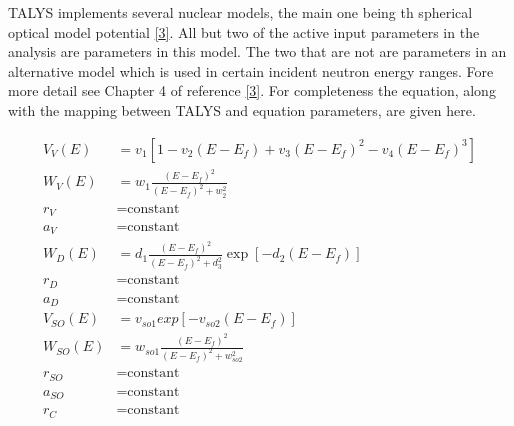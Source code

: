 \documentclass[
  12pt,
  a4paper,
  twoside]{book}
\begin{document}
TALYS implements several nuclear models, the main one being th spherical optical model potential \protect\hyperlink{ref-talys}{{[}3{]}}. All but two of the active input parameters in the analysis are parameters in this model. The two that are not are parameters in an alternative model which is used in certain incident neutron energy ranges. Fore more detail see Chapter 4 of reference \protect\hyperlink{ref-talys}{{[}3{]}}. For completeness the equation, along with the mapping between TALYS and equation parameters, are given here.

\begin{align}
\label{eq:omp-equation}
V_V(E) &= v_1 \left[ 1 - v_2 (E - E_f) + v_3(E - E_f)^2 - v_4(E-E_f)^3 \right]\\ \nonumber
W_V(E) &= w_1 \frac{(E-E_f)^2}{(E-E_f)^2 + w_2^2} \\ \nonumber
r_V &= \textrm{constant}\\ \nonumber
a_V &= \textrm{constant}\\ \nonumber
W_D(E) &= d_1 \frac{(E-E_f)^2}{(E-E_f)^2 + d_3^2}\exp\left[-d_2(E-E_f) \right] \\ \nonumber
r_D &= \textrm{constant}\\ \nonumber
a_D &= \textrm{constant}\\ \nonumber
V_{SO}(E) &= v_{so1} exp\left[ -v_{so2}(E-E_f)\right] \\ \nonumber
W_{SO}(E) &= w_{so1} \frac{(E-E_f)^2}{(E-E_f)^2 + w_{so2}^2}\\ \nonumber
r_{SO} &= \textrm{constant}\\ \nonumber
a_{SO} &= \textrm{constant}\\ \nonumber
r_C &= \textrm{constant}
\end{align}
\end{document}
